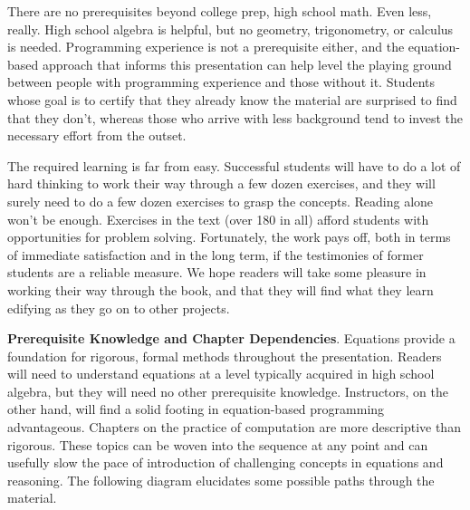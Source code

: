 \begin{preface}
There are no prerequisites beyond college prep, high school math.
Even less, really.
High school algebra is helpful,
but no geometry, trigonometry, or calculus is needed.
Programming experience is not a prerequisite either, and
the equation-based approach that informs this presentation can
help level the playing ground between people
with programming experience and those without it.
Students whose goal is to certify that they already
know the material are surprised to find that they don't,
whereas those who arrive with less background tend
to invest the necessary effort from the outset.

The required learning is far from easy.
Successful students will have to do a lot of hard thinking
to work their way through a few dozen exercises,
and they will surely need to do a few dozen exercises to grasp the concepts.
Reading alone won't be enough.
Exercises in the text (over 180 in all) afford students with opportunities
for problem solving.
Fortunately, the work pays off, both in terms of immediate satisfaction
and in the long term, if the testimonies of former students are a
reliable measure.
We hope readers will take some pleasure in working their way through
the book, and that they will find what they learn
edifying as they go on to other projects.

\vspace{0.5cm}
{\parindent0pt
\textbf{Prerequisite Knowledge and Chapter Dependencies}.
\label{ch:roadmap}
Equations provide a foundation
for rigorous, formal methods throughout the presentation.
Readers will need to understand equations at a level
typically acquired in high school algebra, but they will need
no other prerequisite knowledge.
Instructors, on the other hand, will find
a solid footing in equation-based programming advantageous.
Chapters on the practice of computation are more descriptive than rigorous.
These topics can be woven into the sequence at any point
and can usefully slow the pace of introduction
of challenging concepts in equations and reasoning.
The following diagram elucidates some possible
paths through the material.}
\\ %


\end{preface}
